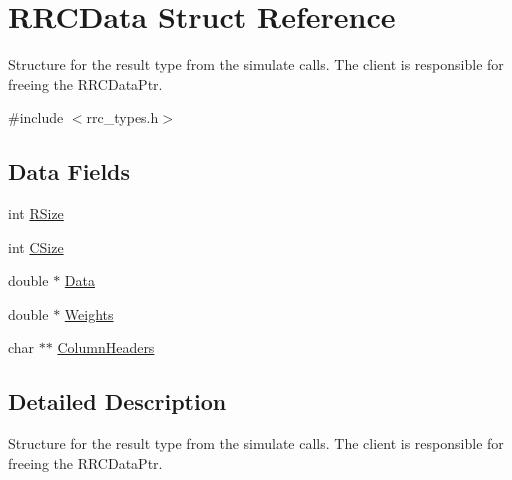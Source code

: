 \hypertarget{struct_r_r_c_data}{\section{R\+R\+C\+Data Struct Reference}
\label{struct_r_r_c_data}
}


Structure for the result type from the simulate calls. The client is responsible for freeing the R\+R\+C\+Data\+Ptr.  




{\ttfamily \#include $<$rrc\+\_\+types.\+h$>$}

\subsection*{Data Fields}
\begin{DoxyCompactItemize}
\item 
int \hyperlink{struct_r_r_c_data_a4d8512c879223c0e0d1522dae38e7819}{R\+Size}
\item 
int \hyperlink{struct_r_r_c_data_a17c9a5894aa9cb3789346dcaa9c370bb}{C\+Size}
\item 
double $\ast$ \hyperlink{struct_r_r_c_data_a7c5cbda3aa940f4b0d6e8a1679307dfc}{Data}
\item 
double $\ast$ \hyperlink{struct_r_r_c_data_a557faafe2bb582e0c88078603aacb1c7}{Weights}
\item 
char $\ast$$\ast$ \hyperlink{struct_r_r_c_data_ab339159e5604808f92fe793f4f43da03}{Column\+Headers}
\end{DoxyCompactItemize}


\subsection{Detailed Description}
Structure for the result type from the simulate calls. The client is responsible for freeing the R\+R\+C\+Data\+Ptr. 

